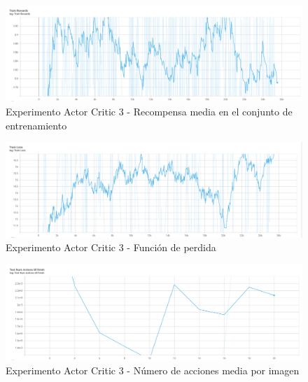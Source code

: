 \begin{figure}[H]
	\centering
	\includegraphics[width=1\textwidth]{figuras/experiments/actor_critic/reward_2_rew_by_two_stop_with_none/train_rewards.png}
	\caption[Experimento Actor Critic 3 - Recompensa media en el conjunto de entrenamiento]{Experimento Actor Critic 3 - Recompensa media en el conjunto de entrenamiento}
	\label{fig-experimento-actor-critic-3-training-reward-mean}
\end{figure}
\begin{figure}[H]
	\centering
	\includegraphics[width=1\textwidth]{figuras/experiments/actor_critic/reward_2_rew_by_two_stop_with_none/train_loss.png}
	\caption[Experimento Actor Critic 3 - Función de perdida]{Experimento Actor Critic 3 - Función de perdida}
	\label{fig-experimento-actor-critic-3-training-loss}
\end{figure}
\begin{figure}[H]
	\centering
	\includegraphics[width=1\textwidth]{figuras/experiments/actor_critic/reward_2_rew_by_two_stop_with_none/test_num_actions_till_finish.png}
	\caption[Experimento Actor Critic 3 - Número de acciones media por imagen]{Experimento Actor Critic 3 - Número de acciones media por imagen}
	\label{fig-experimento-actor-critic-3-testing-actions-till-finish}
\end{figure}
